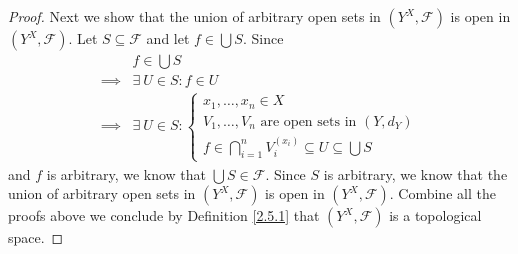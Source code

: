 \begin{proof}
    Next we show that the union of arbitrary open sets in \((Y^X, \mathcal{F})\) is open in \((Y^X, \mathcal{F})\).
    Let \(S \subseteq \mathcal{F}\) and let \(f \in \bigcup S\).
    Since
    \begin{align*}
                 & f \in \bigcup S                               \\
        \implies & \exists\ U \in S : f \in U                    \\
        \implies & \exists\ U \in S : \begin{cases}
            x_1, \dots, x_n \in X                              \\
            V_1, \dots, V_n \text{ are open sets in } (Y, d_Y) \\
            f \in \bigcap_{i = 1}^n V_i^{(x_i)} \subseteq U \subseteq \bigcup S
        \end{cases}
    \end{align*}
    and \(f\) is arbitrary, we know that \(\bigcup S \in \mathcal{F}\).
    Since \(S\) is arbitrary, we know that the union of arbitrary open sets in \((Y^X, \mathcal{F})\) is open in \((Y^X, \mathcal{F})\).
    Combine all the proofs above we conclude by Definition \ref{2.5.1} that \((Y^X, \mathcal{F})\) is a topological space.


\end{proof}
